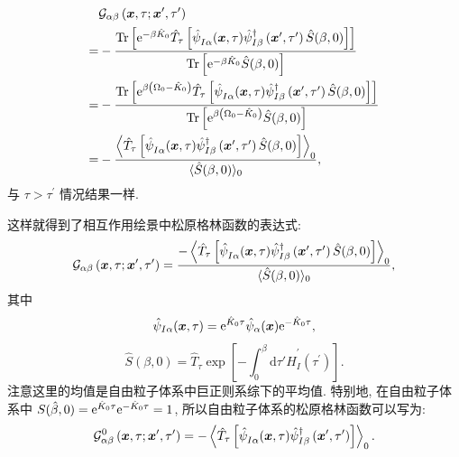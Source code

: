 \begin{align}
&\mathcal{G}_{\alpha \beta}\left(\boldsymbol{x}, \tau ; \boldsymbol{x}^{\prime}, \tau^{\prime}\right)\nonumber \\
=& -\frac{\operatorname{Tr}\left[\mathrm{e}^{-\beta\hat{K}_0} \hat{T}_\tau\left[\hat{\psi}^{}_{I \alpha}(\boldsymbol{x}, \tau) \hat{\psi}_{I \beta}^{\dagger}\left(\boldsymbol{x}^{\prime}, \tau^{\prime}\right) \hat{S}(\beta, 0)\right]\right]}{\operatorname{Tr}\left[\mathrm{e}^{-\beta\hat{K}_0} \hat{S}(\beta, 0)\right]}\nonumber \\
=& -\frac{\operatorname{Tr}\left[\mathrm{e}^{\beta\left(\Omega_0-\hat{K}_0\right)} \hat{T}_\tau\left[\hat{\psi}^{}_{I \alpha}(\boldsymbol{x}, \tau) \hat{\psi}_{I \beta}^{\dagger}\left(\boldsymbol{x}^{\prime}, \tau^{\prime}\right) \hat{S}(\beta, 0)\right]\right]}{\operatorname{Tr}\left[\mathrm{e}^{\beta\left(\Omega_0-\hat{K}_0\right)} \hat{S}(\beta, 0)\right]} \nonumber\\
=& -\frac{\left\langle\hat{T}_\tau\left[\hat{\psi}^{}_{I \alpha}(\boldsymbol{x}, \tau)\hat{\psi}_{I \beta}^{\dagger}\left(\boldsymbol{x}^{\prime}, \tau^{\prime}\right) \hat{S}(\beta, 0)\right]\right\rangle_0}{\langle\hat{S}(\beta, 0)\rangle_0} ,
\end{align}
与 $\tau>\tau^{\prime}$ 情况结果一样.

这样就得到了相互作用绘景中松原格林函数的表达式:
\begin{equation}
\mathcal{G}_{\alpha \beta}\left(\boldsymbol{x}, \tau ; \boldsymbol{x}^{\prime}, \tau^{\prime}\right)=\frac{-\left\langle\hat{T}_\tau\left[\hat{\psi}^{}_{I \alpha}(\boldsymbol{x}, \tau) \hat{\psi}_{I \beta}^{\dagger}\left(\boldsymbol{x}^{\prime}, \tau^{\prime}\right) \hat{S}(\beta, 0)\right]\right\rangle_0}{\langle\hat{S}(\beta, 0)\rangle_0},
\end{equation}
其中
\begin{equation}
\hat{\psi}_{I\alpha}(\boldsymbol{x}, \tau)=\mathrm{e}^{\hat{K}_0 \tau} \hat{\psi}_\alpha(\boldsymbol{x}) \mathrm{e}^{-\hat{K}_0 \tau},
\end{equation}
\begin{equation}
\hat{S}(\beta, 0) =\hat{T}_\tau \exp \left[-\int_0^\beta \mathrm{d} \tau' \hat{H}_I^{\prime}\left(\tau^{\prime}\right)\right].
\end{equation}
注意这里的均值是自由粒子体系中巨正则系综下的平均值. 特别地, 在自由粒子体系中 $S(\hat{\beta}, 0)=\mathrm{e}^{\hat{K}_0 \tau} \mathrm{e}^{-\hat{K}_0 \tau}=1$, 所以自由粒子体系的松原格林函数可以写为:
\begin{equation}
\mathcal{G}_{\alpha \beta}^0\left(\boldsymbol{x}, \tau ; \boldsymbol{x}^{\prime}, \tau^{\prime}\right)=-\left\langle\hat{T}_\tau\left[\hat{\psi}^{}_{I \alpha}(\boldsymbol{x}, \tau) \hat{\psi}_{I \beta}^{\dagger}\left(\boldsymbol{x}^{\prime}, \tau^{\prime}\right)\right]\right\rangle_0.
\end{equation}

